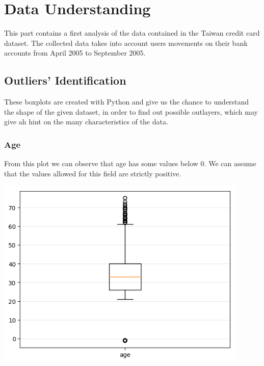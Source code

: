 \documentclass[a4paper]{article}
\begin{document}

\tableofcontents
\newpage




\section{Data Understanding}

This part contains a first analysis of the data contained in the Taiwan credit card dataset. The collected data takes into account users movements on their bank accounts from April 2005 to September 2005.



\subsection{Outliers' Identification}
These boxplots are created with Python and give us the chance to understand the shape of the given dataset, in order to find out possible outlayers, which may give ah hint on the many characteristics of the data.
\subsubsection{Age}
From this plot we can observe that age has some values below $0$. We can assume that the values allowed for this field are strictly positive.


\begin{center}
\includegraphics[width=0.9\textwidth]{../Code/Gemma/boxplots/age.png}
\end{center}
\end{document}
